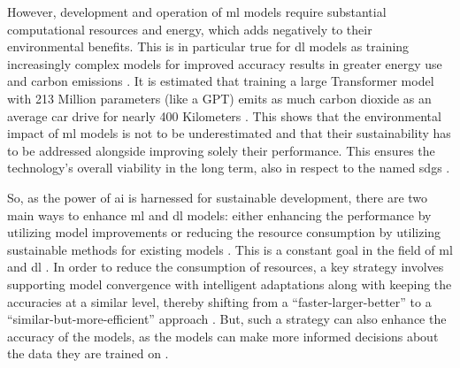 However, development and operation of \gls{ml} models require substantial computational resources and energy, which adds negatively to their environmental benefits. This is in particular true for \gls{dl} models as training increasingly complex models for improved accuracy results in greater energy use and carbon emissions \autocite{Desislavov.Martinez-Plumed.ea2023,Mehlin.Schacht.ea2023,Strubell.Ganesh.ea2019}. It is estimated that training a large Transformer model with 213 Million parameters (like a GPT) emits as much carbon dioxide as an average car drive for nearly 400 Kilometers \autocite{Strubell.Ganesh.ea2019,CSS2023}. This shows that the environmental impact of \gls{ml} models is not to be underestimated and that their sustainability has to be addressed alongside improving solely their performance. This ensures the technology's overall viability in the long term, also in respect to the named \glspl{sdg} \autocite{Getzner.Charpentier.ea2023,Thompson.Greenewald.ea2022}.

So, as the power of \gls{ai} is harnessed for sustainable development, there are two main ways to enhance \gls{ml} and \gls{dl} models: either enhancing the performance by utilizing model improvements or reducing the resource consumption by utilizing sustainable methods for existing models \autocite{Getzner.Charpentier.ea2023,Moharram.Sundaram2023,Zhao.Tu.ea2023}. This is a constant goal in the field of \gls{ml} and \gls{dl} \autocite{Ongsulee2017,Roumeliotis.Tselikas2023}. In order to reduce the consumption of resources, a key strategy involves supporting model convergence with intelligent adaptations along with keeping the accuracies at a similar level, thereby shifting from a \enquote{faster-larger-better} to a \enquote{similar-but-more-efficient} approach \autocite{Lazzaro.Cina.ea2023,Mehlin.Schacht.ea2023,Tao.Meng.ea2022}. But, such a strategy can also enhance the accuracy of the models, as the models can make more informed decisions about the data they are trained on \autocite{Mehlin.Schacht.ea2023}.

